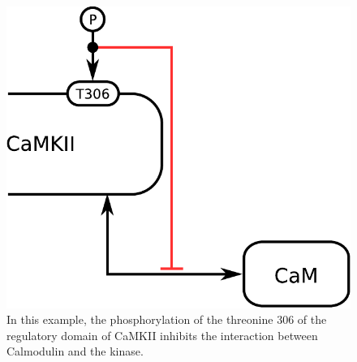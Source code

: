 \begin{figure}[H]
  \centering
  \includegraphics[scale = 0.5]{examples/ex-inhibition}
  \caption{In this example, the phosphorylation of the threonine 306 of the regulatory domain of CaMKII inhibits the interaction between Calmodulin and the kinase.}
  \label{fig:ex-inhibition}
\end{figure}

\normalcolor

